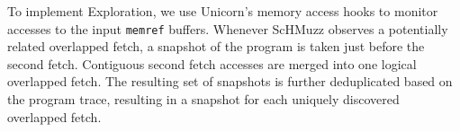 \documentclass[conference]{IEEEtran}
\newcommand{\sysname}{ScHMuzz\xspace}
\newcommand{\stageone}{Exploration\xspace}
\begin{document}

To implement \stageone, we use Unicorn's memory access hooks to monitor accesses to the input \texttt{memref} buffers.
Whenever \sysname observes a potentially related overlapped fetch, 
a snapshot of the program is taken just before the second fetch. Contiguous second fetch accesses 
are merged into one logical overlapped fetch. 
The resulting set of snapshots is further deduplicated based on the program trace, resulting 
in a snapshot for each uniquely discovered overlapped fetch. 
\end{document}
